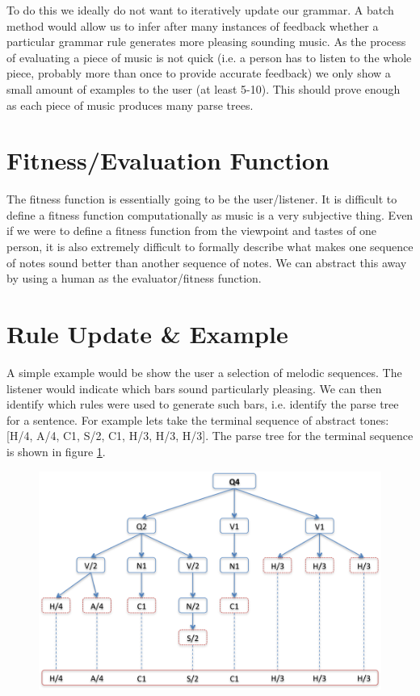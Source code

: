 \documentclass[pdftex,12pt,a4paper]{report}
\begin{document}
To do this we ideally do not want to iteratively update our grammar. A batch method would allow us to infer after many instances of feedback whether a particular grammar rule generates more pleasing sounding music. As the process of evaluating a piece of music is not quick (i.e. a person has to listen to the whole piece, probably more than once to provide accurate feedback) we only show a small amount of examples to the user (at least 5-10). This should prove enough as each piece of music produces many parse trees.

\section{Fitness/Evaluation Function}
The fitness function is essentially going to be the user/listener. It is difficult to define a fitness function computationally as music is a very subjective thing. Even if we were to define a fitness function from the viewpoint and tastes of one person, it is also extremely difficult to formally describe what makes one sequence of notes sound better than another sequence of notes. We can abstract this away by using a human as the evaluator/fitness function.

\section{Rule Update \& Example}
A simple example would be show the user a selection of melodic sequences. The listener would indicate which bars sound particularly pleasing. We can then identify which rules were used to generate such bars, i.e. identify the parse tree for a sentence. For example lets take the terminal sequence of abstract tones: [H/4, A/4, C1, S/2, C1, H/3, H/3, H/3]. The parse tree for the terminal sequence is shown in figure \ref{fig:q4exampleparsetree}.

\begin{figure}[here]
  \centering
  \includegraphics[scale=0.85]{figure/q4exampleparsetree.png}
  \label{fig:q4exampleparsetree}
\end{figure}
\end{document}
